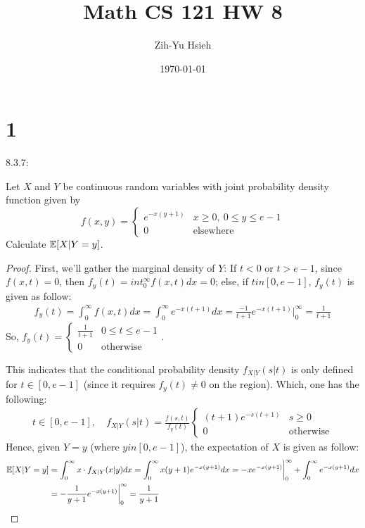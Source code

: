 \documentclass{article}
\title{Math CS 121 HW 8}
\author{Zih-Yu Hsieh}
\date{\today}
\begin{document}
\maketitle

\section*{1}
\begin{ques}\label{q1}
    8.3.7:

    Let $X$ and $Y$ be continuous random variables with joint probability density function given by 
    $$f(x,y)=\begin{cases}
        e^{-x(y+1)} & x\geq 0,\ 0\leq y\leq e-1\\
        0 & \text{elsewhere}
    \end{cases}$$
    Calculate $\mathbb{E}[X|Y=y]$.
\end{ques}

\begin{proof}
    First, we'll gather the marginal density of $Y$: If $t<0$ or $t>e-1$, since $f(x,t)=0$, then $f_y(t) = int_{0}^{\infty}f(x,t)dx = 0$; else, if $t in [0,e-1]$, $f_y(t)$ is given as follow:
    \begin{align}
        f_y(t)=\int_{0}^{\infty}f(x,t)dx = \int_{0}^{\infty}e^{-x(t+1)}dx = \frac{-1}{t+1}e^{-x(t+1)}\bigg|_{0}^{\infty} = \frac{1}{t+1}
    \end{align} 
    So, $f_y(t) = \begin{cases}
        \frac{1}{t+1} & 0\leq t\leq e-1\\ 0 & \text{otherwise}
    \end{cases}$. 

    This indicates that the conditional probability density $f_{X|Y}(s|t)$ is only defined for $t \in [0,e-1]$ (since it requires $f_y(t)\neq 0$ on the region). Which, one has the following:
    \begin{align}
        t\in[0,e-1],\quad f_{X|Y}(s|t) = \frac{f(s,t)}{f_y(t)} \begin{cases}
            (t+1)e^{-s(t+1)} & s\geq 0\\
            0 & \text{otherwise}
        \end{cases}
    \end{align}
    Hence, given $Y=y$ (where $y in [0,e-1]$), the expectation of $X$ is given as follow:
    \begin{align}
        \mathbb{E}[X|Y=y] &= \int_{0}^{\infty}x \cdot f_{X|Y}(x|y)dx = \int_{0}^{\infty}x(y+1)e^{-x(y+1)}dx = -xe^{-x(y+1)}\bigg|_{0}^{\infty} + \int_{0}^{\infty}e^{-x(y+1)}dx\\
        &= -\frac{1}{y+1}e^{-x(y+1)}\bigg|_{0}^{\infty} = \frac{1}{y+1}
    \end{align}
\end{proof}
\end{document}
